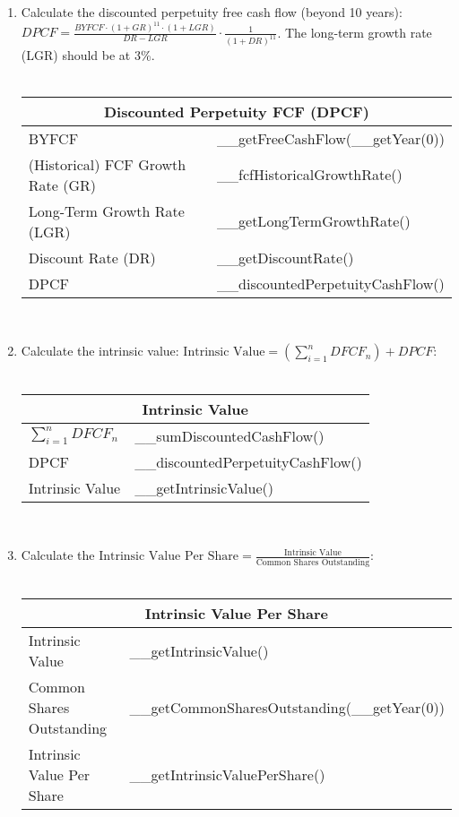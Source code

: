 \begin{enumerate}
	\item Calculate the discounted perpetuity free cash flow (beyond 10 years):
	$DPCF = \frac{BYFCF \cdot (1+GR)^{11} \cdot (1+LGR)}{DR-LGR} \cdot \frac{1}{(1+DR)^{11}}$.
	The long-term growth rate (LGR) should be at 3\%.\\\\
\begin{tabularx}{\textwidth}{|X|X|}
 \hline
 \multicolumn{2}{|c|}{Discounted Perpetuity FCF (DPCF)} \\
 \hline
 BYFCF                             & __getFreeCashFlow(__getYear(0)) \\
 (Historical) FCF Growth Rate (GR) & __fcfHistoricalGrowthRate() \\
 Long-Term Growth Rate (LGR)       & __getLongTermGrowthRate() \\
 Discount Rate (DR)                & __getDiscountRate() \\
 \rowcolor{lightgray} DPCF         & __discountedPerpetuityCashFlow() \\
 \hline
\end{tabularx}\\
	\item Calculate the intrinsic value: $\text{Intrinsic Value} = (\sum_{i=1}^n DFCF_n) + DPCF$:\\\\
\begin{tabularx}{\textwidth}{|X|X|}
 \hline
 \multicolumn{2}{|c|}{Intrinsic Value} \\
 \hline
 $\sum_{i=1}^n DFCF_n$                & __sumDiscountedCashFlow() \\
 DPCF                                 & __discountedPerpetuityCashFlow() \\
 \rowcolor{lightgray} Intrinsic Value & __getIntrinsicValue() \\
 \hline
\end{tabularx}\\
	\item Calculate the $\text{Intrinsic Value Per Share} = \frac{\text{Intrinsic Value}}{\text{Common Shares Outstanding}}$:\\\\
\begin{tabularx}{\textwidth}{|X|X|}
 \hline
 \multicolumn{2}{|c|}{Intrinsic Value Per Share} \\
 \hline
 Intrinsic Value                                & __getIntrinsicValue() \\
 Common Shares Outstanding                      & __getCommonSharesOutstanding(__getYear(0)) \\
 \rowcolor{lightgray} Intrinsic Value Per Share & __getIntrinsicValuePerShare() \\
 \hline
\end{tabularx}
\end{enumerate}

